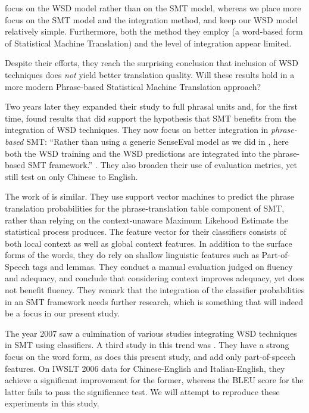 \documentclass[smallextended]{svjour3}       %
\theoremstyle{break}
\begin{document}
\cite{CarpuatWu05} focus on the WSD model rather than on the SMT
model, whereas we place more focus on the SMT model and the integration method,
and keep our WSD model relatively simple. Furthermore, both the method they
employ (a word-based form of Statistical Machine Translation) and the
level of integration appear limited.

Despite their efforts, they reach the surprising conclusion that inclusion of
WSD techniques does \emph{not} yield better translation quality. Will these
results hold in a more modern Phrase-based Statistical Machine Translation
approach?

Two years later they expanded their study to full phrasal units
\citep{CarpuatWu07} and, for the first time, found results that did support the
hypothesis that SMT benefits from the integration of WSD techniques. They now
focus on better integration in \emph{phrase-based} SMT: ``Rather than using a
generic SenseEval model as we did in \cite{CarpuatWu05}, here both the WSD
training and the WSD predictions are integrated into the phrase-based SMT
framework.'' \citep{CarpuatWu07}. They also broaden their use of evaluation
metrics, yet still test on only Chinese to English.

The work of \cite{Gimenez+07} is similar. They use support vector machines to
predict the phrase translation probabilities for the phrase-translation table
component of SMT, rather than relying on the context-unaware Maximum Likehood
Estimate the statistical process produces. The feature vector for their
classifiers consists of both local context as well as global context features.
In addition to the surface forms of the words, they do rely on shallow
linguistic features such as Part-of-Speech tags and lemmas. They conduct a
manual evaluation judged on fluency and adequacy, and conclude that considering
context improves adequacy, yet does not benefit fluency. They remark that the
integration of the classifier probabilities in an SMT framework needs further
research, which is something that will indeed be a focus in our present study.

The year 2007 saw a culmination of various studies integrating WSD techniques in
SMT using classifiers. A third study in this trend was \cite{Stroppa+07}. They
have a strong focus on the word form, as does this present study, and add only
part-of-speech features. On IWSLT 2006 data for Chinese-English and
Italian-English, they achieve a significant improvement for the former, whereas
the BLEU score for the latter fails to pass the significance test. We will
attempt to reproduce these experiments in this study.
\end{document}
